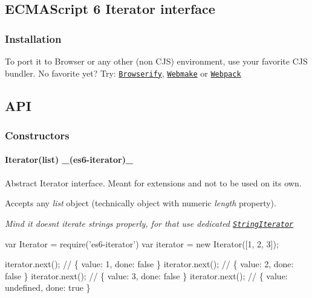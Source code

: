 \subsection*{E\+C\+M\+A\+Script 6 Iterator interface}

\subsubsection*{Installation}



To port it to Browser or any other (non C\+JS) environment, use your favorite C\+JS bundler. No favorite yet? Try\+: \href{http://browserify.org/}{\tt Browserify}, \href{https://github.com/medikoo/modules-webmake}{\tt Webmake} or \href{http://webpack.github.io/}{\tt Webpack}

\subsection*{A\+PI}

\subsubsection*{Constructors}

\paragraph*{Iterator(list) \+\_\+(es6-\/iterator)\+\_\+}

Abstract Iterator interface. Meant for extensions and not to be used on its own.

Accepts any {\itshape list} object (technically object with numeric {\itshape length} property).

{\itshape Mind it doesn\textquotesingle{}t iterate strings properly, for that use dedicated \href{#string-iterator}{\tt String\+Iterator}}


\begin{DoxyCode}
var Iterator = require('es6-iterator')
var iterator = new Iterator([1, 2, 3]);

iterator.next(); // \{ value: 1, done: false \}
iterator.next(); // \{ value: 2, done: false \}
iterator.next(); // \{ value: 3, done: false \}
iterator.next(); // \{ value: undefined, done: true \}
\end{DoxyCode}


